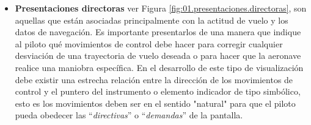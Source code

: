 \begin{itemize}
  \item {\bf Presentaciones directoras} ver Figura \ref{fig:01.presentaciones.directoras},  son aquellas que están asociadas principalmente con la actitud de vuelo y los datos de navegación.  Es importante presentarlos de una manera que indique al piloto qué movimientos de control debe hacer para corregir cualquier desviación de una trayectoria de vuelo deseada o para hacer que la aeronave realice una maniobra específica. 
En el desarrollo de este tipo de visualización debe existir una estrecha relación entre la dirección de los movimientos de control y el puntero del instrumento o elemento indicador de tipo simbólico, esto es los movimientos deben ser en el sentido "natural" para que el piloto pueda obedecer las ``\emph{directivas}'' o ``\emph{demandas}'' de la pantalla.
 
 \end{itemize}


